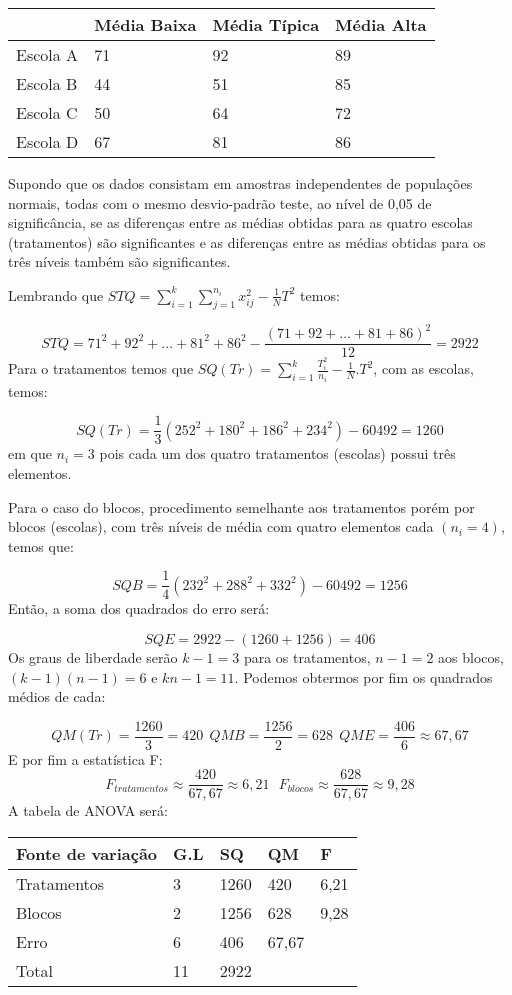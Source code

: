 \documentclass[
  openany]{book}
\begin{document}
\begin{longtable}[]{@{}llll@{}}
\toprule
& Média Baixa & Média Típica & Média Alta\tabularnewline
\midrule
\endhead
Escola A & 71 & 92 & 89\tabularnewline
Escola B & 44 & 51 & 85\tabularnewline
Escola C & 50 & 64 & 72\tabularnewline
Escola D & 67 & 81 & 86\tabularnewline
\bottomrule
\end{longtable}

Supondo que os dados consistam em amostras independentes de populações normais, todas com o mesmo desvio-padrão teste, ao nível de 0,05 de significância, se as diferenças entre as médias obtidas para as quatro escolas (tratamentos) são significantes e as diferenças entre as médias obtidas para os três níveis também são significantes.

Lembrando que \(STQ=\displaystyle \sum^k_{i=1} \displaystyle \sum^{n_i}_{j=1}x^2_{ij}-\frac{1}{N}T^2\) temos:

\[STQ=71^2+92^2+...+81^2+86^2-\frac{(71+92+...+81+86)^2}{12}=2922\]
Para o tratamentos temos que \(SQ(Tr)=\displaystyle \sum^k_{i=1}\frac{T_i^2}{n_i}-\frac{1}{N}.T^2\), com as escolas, temos:

\[SQ(Tr)=\frac{1}{3}(252^2+180^2+186^2+234^2)-60492=1260\]
em que \(n_i=3\) pois cada um dos quatro tratamentos (escolas) possui três elementos.

Para o caso do blocos, procedimento semelhante aos tratamentos porém por blocos (escolas), com três níveis de média com quatro elementos cada \((n_i=4)\), temos que:

\[SQB=\frac{1}{4}(232^2+288^2+332^2)-60492=1256\]
Então, a soma dos quadrados do erro será:

\[SQE=2922-(1260+1256)=406\]
Os graus de liberdade serão \(k-1=3\) para os tratamentos, \(n-1=2\) aos blocos, \((k-1)(n-1)=6\) e \(kn-1=11\). Podemos obtermos por fim os quadrados médios de cada:

\[QM(Tr)=\frac{1260}{3}=420 \ \ QMB=\frac{1256}{2}=628 \ \ QME=\frac{406}{6}\approx 67,67\]
E por fim a estatística F:
\[F_{tratamentos}\approx \frac{420}{67,67}\approx 6,21 \ \ \ F_{blocos}\approx \frac{628}{67,67}\approx 9,28\]
A tabela de ANOVA será:

\begin{longtable}[]{@{}lllll@{}}
\toprule
Fonte de variação & G.L & SQ & QM & F\tabularnewline
\midrule
\endhead
Tratamentos & 3 & 1260 & 420 & 6,21\tabularnewline
Blocos & 2 & 1256 & 628 & 9,28\tabularnewline
Erro & 6 & 406 & 67,67 &\tabularnewline
Total & 11 & 2922 & &\tabularnewline
\bottomrule
\end{longtable}
\end{document}
